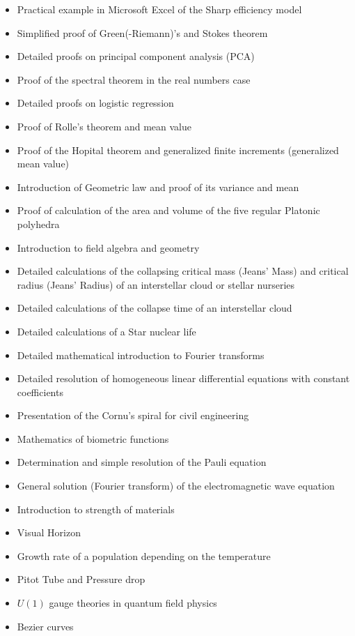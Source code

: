 \begin{itemize}
\begin{itemize}[noitemsep]
			\item Practical example in Microsoft Excel of the Sharp efficiency model
			\item Simplified proof of Green(-Riemann)'s and Stokes theorem
			\item Detailed proofs on principal component analysis (PCA)
			\item Proof of the spectral theorem in the real numbers case
			\item Detailed proofs on logistic regression
			\item Proof of Rolle's theorem and mean value
			\item Proof of the Hopital theorem and generalized finite increments (generalized mean value)
			\item Introduction of Geometric law and proof of its variance and mean
			\item Proof of calculation of the area and volume of the five regular Platonic polyhedra
			\item Introduction to field algebra and geometry
			\item Detailed calculations of the collapsing critical mass (Jeans' Mass) and critical radius (Jeans' Radius) of an interstellar cloud or stellar nurseries
			\item Detailed calculations of the collapse time of an interstellar cloud
			\item Detailed calculations of a Star nuclear life
			\item Detailed mathematical introduction to Fourier transforms
			\item Detailed resolution of homogeneous linear differential equations with constant coefficients
			\item Presentation of the Cornu's spiral for civil engineering
			\item Mathematics of biometric functions
			\item Determination and simple resolution of the Pauli equation
			\item General solution (Fourier transform) of the electromagnetic wave equation
			\item Introduction to strength of materials
			\item Visual Horizon
			\item Growth rate of a population depending on the temperature
			\item Pitot Tube and Pressure drop
			\item $U(1)$ gauge theories in quantum field physics
			\item Bezier curves

\end{itemize}
\end{itemize}
